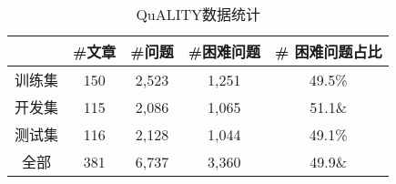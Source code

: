 \begin{table}[htbp]
    \centering
    \caption{QuALITY数据统计}
    \label{tab:2-5}
    \begin{tabular}{c|c|c|c|c}
        \hline
        & \#文章 & \#问题 & \#困难问题 & \# 困难问题占比 \\
        \hline
        训练集 & 150 & 2,523 & 1,251 & 49.5\% \\
        开发集 & 115 & 2,086 & 1,065 & 51.1\& \\
        测试集 & 116 & 2,128 & 1,044 & 49.1\% \\
        全部 & 381 & 6,737 & 3,360 & 49.9\& \\
        \hline
    \end{tabular}
\end{table}

